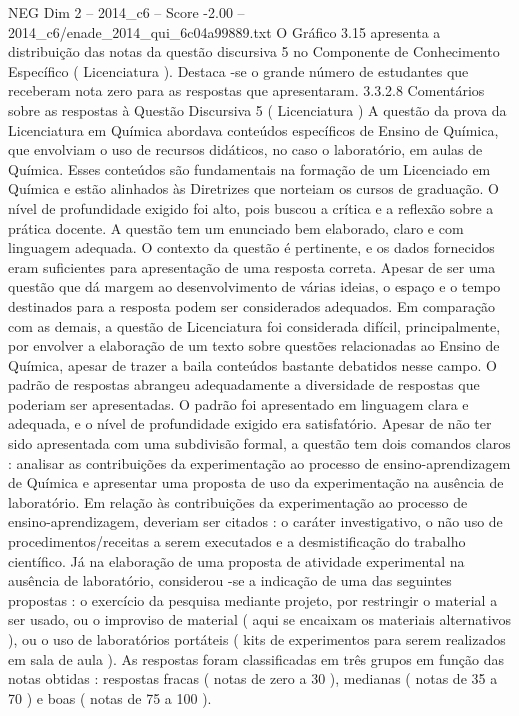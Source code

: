 \begin{textsample}{NEG Dim 2 – 2014\_c6 – Score -2.00 – 2014\_c6/enade\_2014\_qui\_6c04a99889.txt}
O Gráfico 3.15 apresenta a distribuição das notas da questão discursiva 5 no Componente de Conhecimento Específico ( Licenciatura ).
Destaca -se o grande número de estudantes que receberam nota zero para as respostas que apresentaram. 3.3.2.8 Comentários sobre as respostas à Questão Discursiva 5 ( Licenciatura ) A questão da prova da Licenciatura em Química abordava conteúdos específicos de Ensino de Química, que envolviam o uso de recursos didáticos, no caso o laboratório, em aulas de Química.
Esses conteúdos são fundamentais na formação de um Licenciado em Química e estão alinhados às Diretrizes que norteiam os cursos de graduação.
O nível de profundidade exigido foi alto, pois buscou a crítica e a reflexão sobre a prática docente.
A questão tem um enunciado bem elaborado, claro e com linguagem adequada.
O contexto da questão é pertinente, e os dados fornecidos eram suficientes para apresentação de uma resposta correta.
Apesar de ser uma questão que dá margem ao desenvolvimento de várias ideias, o espaço e o tempo destinados para a resposta podem ser considerados adequados.
Em comparação com as demais, a questão de Licenciatura foi considerada difícil, principalmente, por envolver a elaboração de um texto sobre questões relacionadas ao Ensino de Química, apesar de trazer a baila conteúdos bastante debatidos nesse campo.
O padrão de respostas abrangeu adequadamente a diversidade de respostas que poderiam ser apresentadas.
O padrão foi apresentado em linguagem clara e adequada, e o nível de profundidade exigido era satisfatório.
Apesar de não ter sido apresentada com uma subdivisão formal, a questão tem dois comandos claros : analisar as contribuições da experimentação ao processo de ensino-aprendizagem de Química e apresentar uma proposta de uso da experimentação na ausência de laboratório.
Em relação às contribuições da experimentação ao processo de ensino-aprendizagem, deveriam ser citados : o caráter investigativo, o não uso de procedimentos/receitas a serem executados e a desmistificação do trabalho científico.
Já na elaboração de uma proposta de atividade experimental na ausência de laboratório, considerou -se a indicação de uma das seguintes propostas : o exercício da pesquisa mediante projeto, por restringir o material a ser usado, ou o improviso de material ( aqui se encaixam os materiais alternativos ), ou o uso de laboratórios portáteis ( kits de experimentos para serem realizados em sala de aula ).
As respostas foram classificadas em três grupos em função das notas obtidas : respostas fracas ( notas de zero a 30 ), medianas ( notas de 35 a 70 ) e boas ( notas de 75 a 100 ).

\end{textsample}
